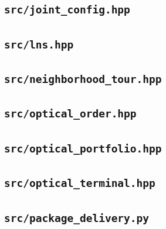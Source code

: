 \subsection*{\texttt{src/joint\_config.hpp}}

\subsection*{\texttt{src/lns.hpp}}

\subsection*{\texttt{src/neighborhood\_tour.hpp}}

\subsection*{\texttt{src/optical\_order.hpp}}

\subsection*{\texttt{src/optical\_portfolio.hpp}}

\subsection*{\texttt{src/optical\_terminal.hpp}}

\subsection*{\texttt{src/package\_delivery.py}}

